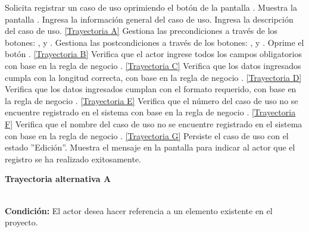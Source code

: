 	\begin{UCtrayectoria}
		\UCpaso[\UCactor] Solicita registrar un caso de uso oprimiendo el botón  de la pantalla .
		\UCpaso[\UCsist] Muestra la pantalla .\label{CU12.1-P2}
		\UCpaso[\UCactor] Ingresa la información general del caso de uso. \label{CU12.1-P12}
		\UCpaso[\UCactor] Ingresa la descripción del caso de uso. \hyperlink{CU12-1:TAA}{[Trayectoria A]}
		\UCpaso[\UCactor] Gestiona las precondiciones a través de los botones: , \editar y \eliminar. \label{CU12.1-P17}
		\UCpaso[\UCactor] Gestiona las postcondiciones a través de los botones: , \editar y \eliminar. \label{CU12.1-P18}
		\UCpaso[\UCactor] Oprime el botón . \label{CU10.1-P5} \hyperlink{CU12-1:TAB}{[Trayectoria B]}
		\UCpaso[\UCsist] Verifica que el actor ingrese todos los campos obligatorios con base en la regla de negocio . \hyperlink{CU12-1:TAC}{[Trayectoria C]}
		\UCpaso[\UCsist] Verifica que los datos ingresados cumpla con la longitud correcta, con base en la regla de negocio . \hyperlink{CU12-1:TAD}{[Trayectoria D]}
		\UCpaso[\UCsist] Verifica que los datos ingresados cumplan con el formato requerido, con base en la regla de negocio . \hyperlink{CU12-1:TAE}{[Trayectoria E]}
		\UCpaso[\UCsist] Verifica que el número del caso de uso no se encuentre registrado en el sistema con base en la regla de negocio . \hyperlink{CU12-1:TAF}{[Trayectoria F]}
		\UCpaso[\UCsist] Verifica que el nombre del caso de uso no se encuentre registrado en el sistema con base en la regla de negocio . \hyperlink{CU12-1:TAG}{[Trayectoria G]}
		\UCpaso[\UCsist] Persiste el caso de uso con el estado ''Edición''.
		\UCpaso[\UCsist] Muestra el mensaje  en la pantalla  para indicar al actor que el registro se ha realizado exitosamente.
	\end{UCtrayectoria}		
\hypertarget{CU12-1:TAA}{\textbf{Trayectoria alternativa A}}\\
\noindent \textbf{Condición:} El actor desea hacer referencia a un elemento existente en el proyecto.
